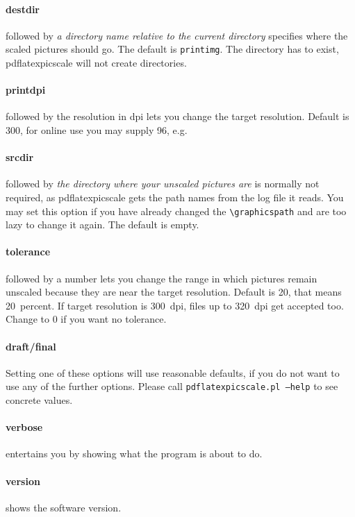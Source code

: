\documentclass[10pt,a4paper]{article}
\begin{document}
\paragraph{destdir} followed by \emph{a directory name relative to the current
directory} specifies where the scaled pictures should go. The default is
\texttt{printimg}. The directory has to exist, pdflatexpicscale will not
create directories.

\paragraph{printdpi} followed by the resolution in dpi lets you change the
target resolution. Default is 300, for online use you may supply 96, e.g.

\paragraph{srcdir} followed by \emph{the directory where your unscaled
  pictures are} is normally not required, as pdflatexpicscale gets the path
names from the log file it reads. You may set this option if you have already
changed the \verb|\graphicspath| and are too lazy to change it again. The
default is empty.

\paragraph{tolerance} followed by a number lets you change the range in which
pictures remain unscaled because they are near the target resolution. Default
is 20, that means 20~percent. If target resolution is 300~dpi, files up to
320~dpi get accepted too. Change to 0 if you want no tolerance.

\paragraph{draft/final} Setting one of these options will use reasonable
defaults, if you do not want to use any of the further options.
Please call \texttt{pdflatexpicscale.pl --help} to see concrete values.

\paragraph{verbose} entertains you by showing what the program is about to
do. 

\paragraph{version} shows the software version.
\end{document}
